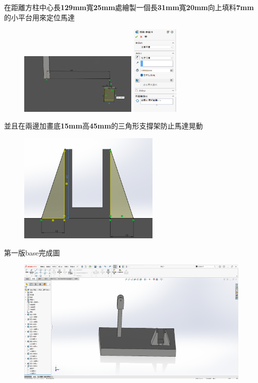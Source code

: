 \noindent 在距離方柱中心長\textbf{129mm}寬\textbf{25mm}處繪製一個長\textbf{31mm}寬\textbf{20mm}向上填料\textbf{7mm}的小平台用來定位馬達

\begin{figure}[h!]
    \centering
    \includegraphics[width=0.5\textwidth]{./../images/6-1-33.png}
    \includegraphics[width=0.2\textwidth]{./../images/6-1-34.png}
\end{figure}

\noindent 並且在兩邊加畫底\textbf{15mm}高\textbf{45mm}的三角形支撐架防止馬達晃動

\begin{figure}[h!]
    \centering
    \includegraphics[width=0.6\textwidth]{./../images/6-1-35.png}
\end{figure}

\noindent 第一版base完成圖

\begin{figure}[h!]
    \centering
    \includegraphics[width=1\textwidth]{./../images/6-1-36.png}
\end{figure}

